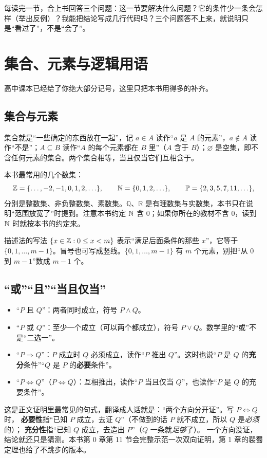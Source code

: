\begin{tip}[一句话学习方法]
每读完一节，合上书回答三个问题：这一节要解决什么问题？它的条件少一条会怎样（举出反例）？我能把结论写成几行代码吗？三个问题答不上来，就说明只是“看过了”，不是“会了”。
\end{tip}

\section{集合、元素与逻辑用语}
高中课本已经给了你绝大部分记号，这里只把本书用得多的补齐。

\subsection{集合与元素}
集合就是“一些确定的东西放在一起”，记 $a\in A$ 读作“$a$ 是 $A$ 的元素”，$a\notin A$ 读作“不是”；$A\subseteq B$ 读作“$A$ 的每个元素都在 $B$ 里”（$A$ 含于 $B$）；$\varnothing$ 是空集，即不含任何元素的集合。两个集合相等，当且仅当它们互相含于。

本书最常用的几个数集：
\[
\mathbb Z=\{\ldots,-2,-1,0,1,2,\ldots\},\qquad \mathbb N=\{0,1,2,\ldots\},\qquad \mathbb P=\{2,3,5,7,11,\ldots\},
\]
分别是整数集、非负整数集、素数集。$\mathbb Q$、$\mathbb R$ 是有理数集与实数集，本书只在说明“范围放宽了”时提到。注意本书约定 $\mathbb N$ 含 $0$；如果你所在的教材不含 $0$，读到 $\mathbb N$ 时就按本书的约定来。

描述法的写法 $\{x\in\mathbb Z:0\le x<m\}$ 表示“满足后面条件的那些 $x$”，它等于 $\{0,1,\ldots,m-1\}$。冒号也可写成竖线。$\{0,1,\ldots,m-1\}$ 有 $m$ 个元素，别把“从 $0$ 到 $m-1$”数成 $m-1$ 个。

\subsection{“或”“且”“当且仅当”}
\begin{itemize}
\item “$P$ 且 $Q$”：两者同时成立，符号 $P\land Q$。
\item “$P$ 或 $Q$”：至少一个成立（可以两个都成立），符号 $P\lor Q$。数学里的“或”不是“二选一”。
\item “$P\Rightarrow Q$”：$P$ 成立时 $Q$ 必须成立，读作“$P$ 推出 $Q$”。这时也说“$P$ 是 $Q$ 的\textbf{充分}条件”“$Q$ 是 $P$ 的\textbf{必要}条件”。
\item “$P\iff Q$”（$P\Leftrightarrow Q$）：互相推出，读作“$P$ 当且仅当 $Q$”，也读作“$P$ 是 $Q$ 的充要条件”。
\end{itemize}

\begin{tip}
这是正文证明里最常见的句式，翻译成人话就是：“两个方向分开证”。写 $P\iff Q$ 时，
\textbf{必要性}指“已知 $P$ 成立，去证 $Q$”（不做到的话 $P$ 就不成立，所以 $Q$ 是\emph{必须}的）；
\textbf{充分性}指“已知 $Q$ 成立，去造出 $P$”（$Q$ 一条就\emph{足够}了）。
一个方向没证，结论就还只是猜测。本书第 0 章第 11 节会完整示范一次双向证明，第 1 章的裴蜀定理也给了不跳步的版本。
\end{tip}

